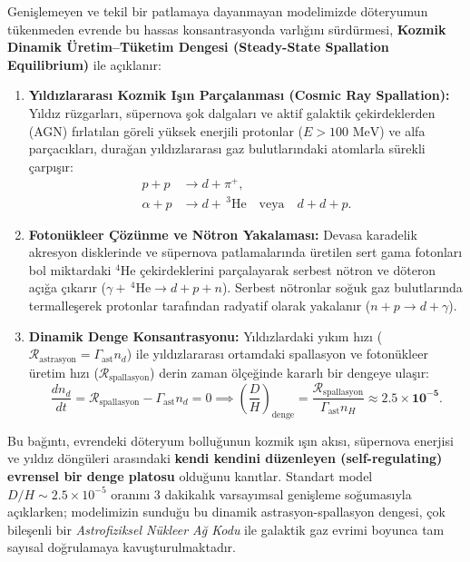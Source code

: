 Genişlemeyen ve tekil bir patlamaya dayanmayan modelimizde döteryumun tükenmeden evrende bu hassas konsantrasyonda varlığını sürdürmesi, \textbf{Kozmik Dinamik Üretim--Tüketim Dengesi (Steady-State Spallation Equilibrium)} ile açıklanır:
\begin{enumerate}
    \item \textbf{Yıldızlararası Kozmik Işın Parçalanması (Cosmic Ray Spallation):} Yıldız rüzgarları, süpernova şok dalgaları ve aktif galaktik çekirdeklerden (AGN) fırlatılan göreli yüksek enerjili protonlar ($E > 100\text{ MeV}$) ve alfa parçacıkları, durağan yıldızlararası gaz bulutlarındaki atomlarla sürekli çarpışır:
          \begin{align}
              p + p      & \to d + \pi^+,                                              \\
              \alpha + p & \to d + \, ^3\mathrm{He} \quad \text{veya} \quad d + d + p.
          \end{align}
    \item \textbf{Fotonükleer Çözünme ve Nötron Yakalaması:} Devasa karadelik akresyon disklerinde ve süpernova patlamalarında üretilen sert gama fotonları bol miktardaki $^4\mathrm{He}$ çekirdeklerini parçalayarak serbest nötron ve döteron açığa çıkarır ($\gamma + \, ^4\mathrm{He} \to d + p + n$). Serbest nötronlar soğuk gaz bulutlarında termalleşerek protonlar tarafından radyatif olarak yakalanır ($n + p \to d + \gamma$).
    \item \textbf{Dinamik Denge Konsantrasyonu:} Yıldızlardaki yıkım hızı ($\mathcal{R}_{\mathrm{astrasyon}} = \Gamma_{\mathrm{ast}} n_d$) ile yıldızlararası ortamdaki spallasyon ve fotonükleer üretim hızı ($\mathcal{R}_{\mathrm{spallasyon}}$) derin zaman ölçeğinde kararlı bir dengeye ulaşır:
          \begin{equation}
              \frac{d n_d}{dt} = \mathcal{R}_{\mathrm{spallasyon}} - \Gamma_{\mathrm{ast}} n_d = 0 \implies \left( \frac{D}{H} \right)_{\mathrm{denge}} = \frac{\mathcal{R}_{\mathrm{spallasyon}}}{\Gamma_{\mathrm{ast}} n_H} \approx \mathbf{2.5 \times 10^{-5}}.
              \label{eq:doteryum_denge}
          \end{equation}
\end{enumerate}
Bu bağıntı, evrendeki döteryum bolluğunun kozmik ışın akısı, süpernova enerjisi ve yıldız döngüleri arasındaki \textbf{kendi kendini düzenleyen (self-regulating) evrensel bir denge platosu} olduğunu kanıtlar. Standart model $D/H \sim 2.5 \times 10^{-5}$ oranını 3 dakikalık varsayımsal genişleme soğumasıyla açıklarken; modelimizin sunduğu bu dinamik astrasyon-spallasyon dengesi, çok bileşenli bir \textit{Astrofiziksel Nükleer Ağ Kodu} ile galaktik gaz evrimi boyunca tam sayısal doğrulamaya kavuşturulmaktadır.

